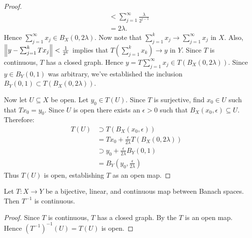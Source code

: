 \begin{proof}
\begin{equation*}
\begin{split}
                    & < \sum_{j = 1}^\infty \frac{\lambda}{2^{j-1}} \\
                    & = 2\lambda.
                \end{split}
                \end{equation*}
            Hence $\sum_{j = 1}^\infty x_j \in B_X(0,2\lambda)$. Now note that $\sum_{j = 1}^k x_j \rightarrow \sum_{j = 1}^\infty x_j$ in $X$. Also, \nl $\left\lVert y - \sum_{j = 1}^k T x_j \right\rVert < \frac{1}{2^k}$ implies that $T \left(\sum_{j = 1}^k x_k\right) \rightarrow y$ in $Y$. Since $T$ is continuous, $T$ has a closed graph. Hence $y = T \sum_{j = 1}^\infty x_j \in T(B_X(0,2\lambda))$. Since $y \in B_Y(0,1)$ was arbitrary, we've established the inclusion $B_Y(0,1) \subset T(B_X(0,2\lambda))$.

            Now let $U \subseteq X$ be open. Let $y_0 \in T(U)$. Since $T$ is surjective, find $x_0 \in U$ such that $T x_0 = y_0$. Since $U$ is open there exists an $\epsilon > 0$ such that $B_X(x_0, \epsilon) \subseteq U$. Therefore:
                \begin{equation*}
                \begin{split}
                    T(U) 
                    & \supset T(B_X(x_0,\epsilon)) \\
                    & = Tx_0 + \frac{\epsilon}{2\lambda}T(B_X(0,2\lambda)) \\
                    & \supset y_0 + \frac{\epsilon}{2\lambda}B_Y(0,1) \\
                    & = B_Y\left(y_0,\frac{\epsilon}{2\lambda}\right)
                \end{split}
                \end{equation*}
            Thus $T(U)$ is open, establishing $T$ as an open map.
    \end{proof} 

\begin{corollary}\label{cor:bij-lin-cont-implies-inverse-cont}
    Let $T:X \rightarrow Y$ be a bijective, linear, and continuous map between Banach spaces. Then $T^{-1}$ is continuous.
\end{corollary}
    \begin{proof}
        Since $T$ is continuous, $T$ has a closed graph. By the  $T$ is an open map. Hence $(T^{-1})^{-1}(U) = T(U)$ is open.
    \end{proof}


